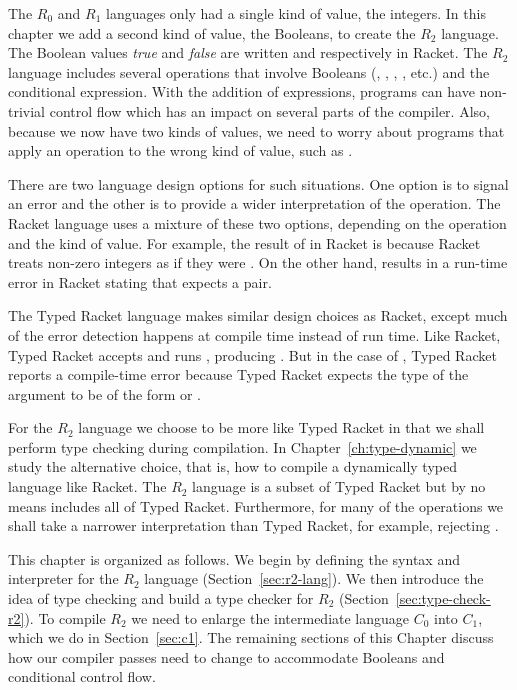 \documentclass[11pt]{book}
\begin{document}
The $R_0$ and $R_1$ languages only had a single kind of value, the
integers. In this chapter we add a second kind of value, the Booleans,
to create the $R_2$ language. The Boolean values \emph{true} and
\emph{false} are written  and  respectively in
Racket.  The $R_2$ language includes several operations that involve
Booleans (, , , \key{<}, etc.) and the
conditional  expression. With the addition of 
expressions, programs can have non-trivial control flow which has an
impact on several parts of the compiler. Also, because we now have two
kinds of values, we need to worry about programs that apply an
operation to the wrong kind of value, such as .

There are two language design options for such situations.  One option
is to signal an error and the other is to provide a wider
interpretation of the operation. The Racket language uses a mixture of
these two options, depending on the operation and the kind of
value. For example, the result of  in Racket is
 because Racket treats non-zero integers as if they were
. On the other hand,  results in a run-time
error in Racket stating that  expects a pair.

The Typed Racket language makes similar design choices as Racket,
except much of the error detection happens at compile time instead of
run time. Like Racket, Typed Racket accepts and runs ,
producing . But in the case of , Typed Racket
reports a compile-time error because Typed Racket expects the type of
the argument to be of the form  or .

For the $R_2$ language we choose to be more like Typed Racket in that
we shall perform type checking during compilation. In
Chapter~\ref{ch:type-dynamic} we study the alternative choice, that
is, how to compile a dynamically typed language like Racket.  The
$R_2$ language is a subset of Typed Racket but by no means includes
all of Typed Racket. Furthermore, for many of the operations we shall
take a narrower interpretation than Typed Racket, for example,
rejecting .

This chapter is organized as follows.  We begin by defining the syntax
and interpreter for the $R_2$ language (Section~\ref{sec:r2-lang}). We
then introduce the idea of type checking and build a type checker for
$R_2$ (Section~\ref{sec:type-check-r2}). To compile $R_2$ we need to
enlarge the intermediate language $C_0$ into $C_1$, which we do in
Section~\ref{sec:c1}. The remaining sections of this Chapter discuss
how our compiler passes need to change to accommodate Booleans and
conditional control flow.
\end{document}
